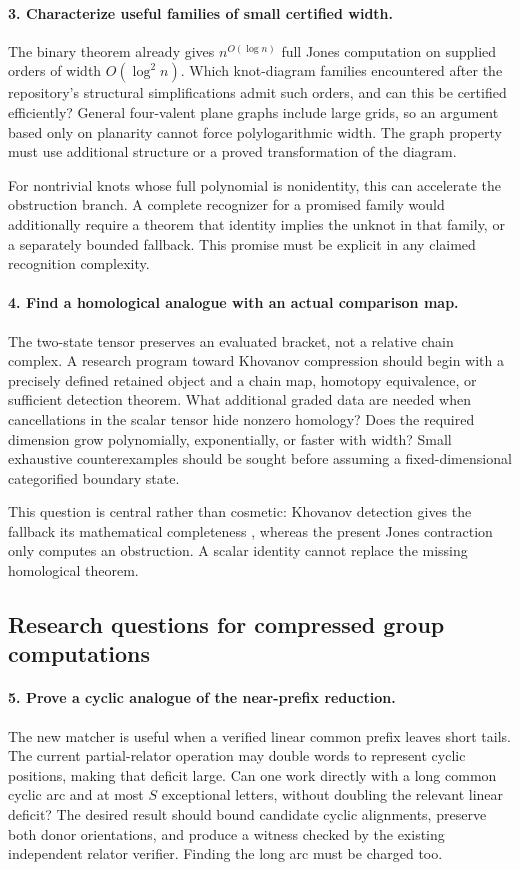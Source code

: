 \paragraph{3. Characterize useful families of small certified width.}
The binary theorem already gives $n^{O(\log n)}$ full Jones computation
on supplied orders of width $O(\log^2 n)$. Which knot-diagram families
encountered after the repository's structural simplifications admit such
orders, and can this be certified efficiently? General four-valent plane
graphs include large grids, so an argument based only on planarity cannot
force polylogarithmic width. The graph property must use additional
structure or a proved transformation of the diagram.

For nontrivial knots whose full polynomial is nonidentity, this can
accelerate the obstruction branch. A complete recognizer for a promised
family would additionally require a theorem that identity implies the
unknot in that family, or a separately bounded fallback. This promise
must be explicit in any claimed recognition complexity.

\paragraph{4. Find a homological analogue with an actual comparison map.}
The two-state tensor preserves an evaluated bracket, not a relative
chain complex. A research program toward Khovanov compression should
begin with a precisely defined retained object and a chain map, homotopy
equivalence, or sufficient detection theorem. What additional graded
data are needed when cancellations in the scalar tensor hide nonzero
homology? Does the required dimension grow polynomially, exponentially,
or faster with width? Small exhaustive counterexamples should be sought
before assuming a fixed-dimensional categorified boundary state.

This question is central rather than cosmetic: Khovanov detection gives
the fallback its mathematical completeness \cite{kronheimer-mrowka},
whereas the present Jones contraction only computes an obstruction.
A scalar identity cannot replace the missing homological theorem.

\subsection{Research questions for compressed group computations}

\paragraph{5. Prove a cyclic analogue of the near-prefix reduction.}
The new matcher is useful when a verified linear common prefix leaves
short tails. The current partial-relator operation may double words to
represent cyclic positions, making that deficit large. Can one work
directly with a long common cyclic arc and at most $S$ exceptional
letters, without doubling the relevant linear deficit? The desired
result should bound candidate cyclic alignments, preserve both donor
orientations, and produce a witness checked by the existing independent
relator verifier. Finding the long arc must be charged too.

